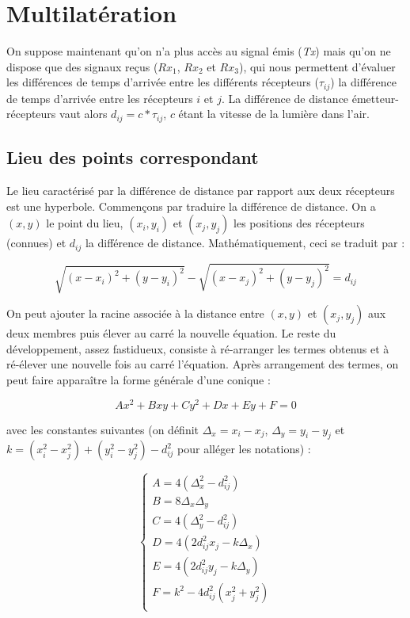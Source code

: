 \documentclass[10pt,a4paper]{article}
\begin{document}
			
\section{Multilatération}
On suppose maintenant qu'on n'a plus accès au signal émis (\textit{Tx}) mais qu'on ne dispose que des signaux reçus ($Rx_1$, $Rx_2$ et $Rx_3$), qui nous permettent d'évaluer les différences de temps d'arrivée entre les différents récepteurs ($\tau_{ij}$) la différence de temps d'arrivée entre les récepteurs $i$ et $j$. La différence de distance émetteur-récepteurs vaut alors $d_{ij} = c*\tau_{ij}$, $c$ étant la vitesse de la lumière dans l'air.

\subsection{Lieu des points correspondant}
Le lieu caractérisé par la différence de distance par rapport aux deux récepteurs est une hyperbole. Commençons par traduire la différence de distance. On a $(x,y)$ le point du lieu, $(x_i,y_i)$ et $(x_j,y_j)$ les positions des récepteurs (connues) et $d_{ij}$ la différence de distance. Mathématiquement, ceci se traduit par :

\begin{equation}
\sqrt{(x-x_i)^2 + (y-y_i)^2} - \sqrt{(x-x_j)^2 + (y-y_j)^2} = d_{ij}
\label{Hyperbole}
\end{equation}

On peut ajouter la racine associée à la distance entre $(x,y)$ et $(x_j,y_j)$ aux deux membres puis élever au carré la nouvelle équation. Le reste du développement, assez fastidueux, consiste à ré-arranger les termes obtenus et à ré-élever une nouvelle fois au carré l'équation. Après arrangement des termes, on peut faire apparaître la forme générale d'une conique :

\begin{equation}
Ax^2 + Bxy + Cy^2 + Dx + Ey + F = 0
\end{equation}

avec les constantes suivantes (on définit $\Delta_x = x_i - x_j$, $\Delta_y = y_i - y_j$ et $k = (x_i^2 - x_j^2) + (y_i^2 - y_j^2) - d_{ij}^2$ pour alléger les notations) :


$$\begin{cases}
A = 4(\Delta_x^2 - d_{ij}^2)\\
B = 8\Delta_x \Delta_y\\
C = 4(\Delta_y^2 - d_{ij}^2)\\
D = 4(2d_{ij}^2x_j-k\Delta_x)\\
E = 4(2d_{ij}^2y_j-k\Delta_y)\\
F = k^2-4d_{ij}^2(x_j^2+y_j^2)\\
\end{cases}$$
\end{document}

